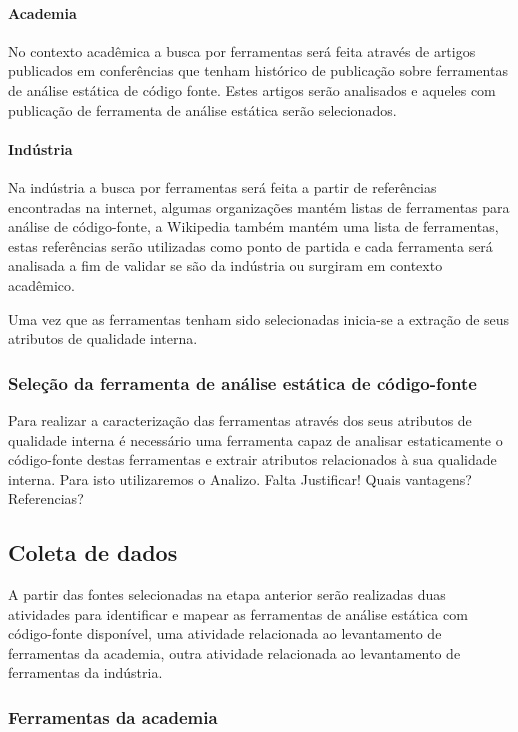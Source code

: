 \documentclass[12pt]{article}
\begin{document}
\paragraph{Academia} No contexto acadêmica a busca por ferramentas será feita
através de artigos publicados em conferências que tenham histórico de
publicação sobre ferramentas de análise estática de código fonte. Estes
artigos serão analisados e aqueles com publicação de ferramenta de análise
estática serão selecionados.

\paragraph{Indústria} Na indústria a busca por ferramentas será feita a partir
de referências encontradas na internet, algumas organizações mantém listas de
ferramentas para análise de código-fonte, a Wikipedia também mantém uma lista
de ferramentas, estas referências serão utilizadas como ponto de partida e
cada ferramenta será analisada a fim de validar se são da indústria ou
surgiram em contexto acadêmico.

Uma vez que as ferramentas tenham sido selecionadas inicia-se a extração de
seus atributos de qualidade interna.

\subsubsection{Seleção da ferramenta de análise estática de código-fonte}

Para realizar a caracterização das ferramentas através dos seus atributos de
qualidade interna é necessário uma ferramenta capaz de analisar estaticamente
o código-fonte destas ferramentas e extrair atributos relacionados à sua
qualidade interna. Para isto utilizaremos o Analizo\cite{Terceiro2010}. Falta
Justificar! Quais vantagens? Referencias?

\subsection{Coleta de dados}

A partir das fontes selecionadas na etapa anterior serão realizadas duas
atividades para identificar e mapear as ferramentas de análise estática com
código-fonte disponível, uma atividade relacionada ao levantamento de
ferramentas da academia, outra atividade relacionada ao levantamento de
ferramentas da indústria.

\subsubsection{Ferramentas da academia}
\end{document}
